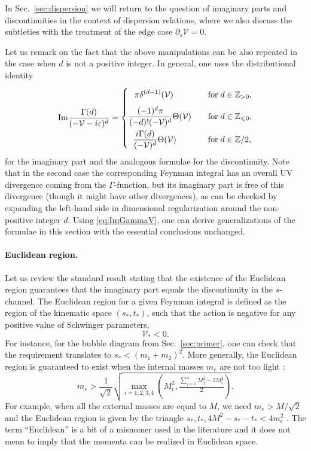 \documentclass[12pt]{article}
\numberwithin{figure}{section}
\def \be {\begin{equation}}
\def \ee {\end{equation}}
\def \eps {\varepsilon}
\def \V {\mathcal{V}}
\def \leq {\leqslant}
\def \Z {\mathbb{Z}}
\def \Im {\mathrm{Im}}
\begin{document}
    In Sec.~\ref{sec:dispersion} we will return to the question of imaginary parts and discontinuities in the context of dispersion relations, where we also discuss the subtleties with the treatment of the edge case $\partial_s \V = 0$.
	
	Let us remark on the fact that the above manipulations can be also repeated in the case when $d$ is not a positive integer. In general, one uses the distributional identity
	\be\label{eq:ImGammaV}
	\Im \frac{\Gamma(d)}{(-\V - i\eps)^d} = \begin{dcases}
    \phantom{\frac{1}{1}} \pi \delta^{(d-1)}(\V) \quad&\mathrm{for}\; d \in \Z_{> 0},\\
	\frac{(-1)^d\pi}{(-d)! (-\V)^d} \Theta(\V) \quad&\mathrm{for}\; d \in \Z_{\leq 0},\\
	\;\;\frac{i \Gamma(d)}{(-\V)^d} \Theta(\V) \quad&\mathrm{for}\; d \in \Z/2,
	\end{dcases}
	\ee
	for the imaginary part and the analogous formulae for the discontinuity.
	Note that in the second case the corresponding Feynman integral has an overall UV divergence coming from the $\Gamma$-function, but its imaginary part is free of this divergence (though it might have other divergences), as can be checked by expanding the left-hand side in dimensional regularization around the non-positive integer $d$. Using \eqref{eq:ImGammaV}, one can derive generalizations of the formulae in this section with the essential conclusions unchanged.
	
	\paragraph{Euclidean region.} Let us review the standard result stating that the existence of the Euclidean region guarantees that the imaginary part equals the discontinuity in the $s$-channel. The Euclidean region for a given Feynman integral is defined as the region of the kinematic space $(s_\ast, t_\ast)$, such that the action is negative for any positive value of Schwinger parameters,
	\be\label{eq:V-ast}
	\V_\ast < 0.
	\ee
	For instance, for the bubble diagram from Sec.~\ref{sec:primer}, one can check that the requirement translates to $s_\ast < (m_1+m_2)^2$. More generally, the Euclidean region is guaranteed to exist when the internal masses $m_e$ are not too light \cite{Mizera:2021ujs}:
	\be
	m_e > \frac{1}{\sqrt{2}} \sqrt{\max_{i=1,2,3,4} \left( M_i^2, \tfrac{\sum_{j=1}^{4} M_j^2 - 2M_i^2}{2} \right)}.
	\ee
	For example, when all the external masses are equal to $M$, we need $m_e > M/\sqrt{2}$ and the Euclidean region is given by the triangle $s_\ast,t_\ast, 4M^2 {-} s_\ast {-} t_\ast < 4m_e^2$ \cite{10.1143/PTP.20.690,Wu:1961zz}. The term ``Euclidean'' is a bit of a misnomer used in the literature \cite{Eden:1965aww} and it does not mean to imply that the momenta can be realized in Euclidean space.
	
\end{document}
